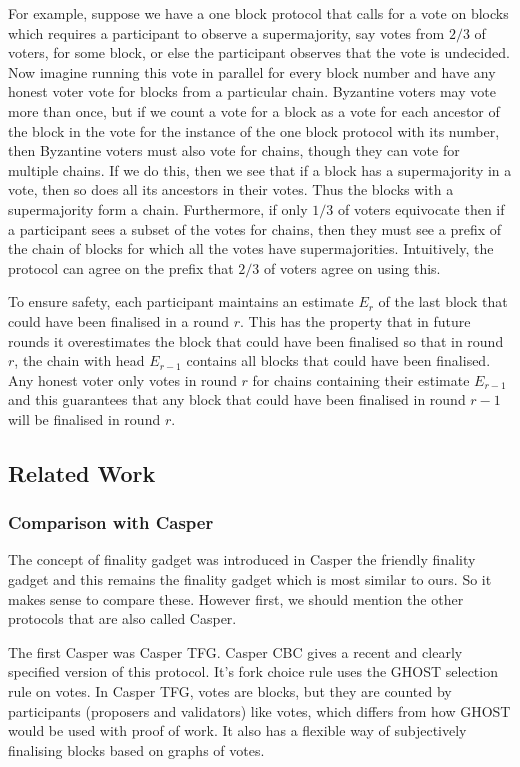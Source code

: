 \documentclass{article}
\begin{document}
For example, suppose we have a one block protocol that calls for a vote on blocks which requires a participant to observe a supermajority, say votes from  $2/3$ of voters, for some block, or else the participant observes that the vote is undecided. Now imagine running this vote in parallel for every block number and have any honest voter vote for blocks from a particular chain.
Byzantine voters may vote more than once, but if we count a vote for a block as a vote for each ancestor of the block in the vote for the instance of the one block protocol with its number, then Byzantine voters must also vote for chains, though they can vote for multiple chains.
If we do this, then we see that if a block has a supermajority in a vote, then so does all its ancestors in their votes. Thus the blocks with a supermajority form a chain.
Furthermore, if only $1/3$ of voters equivocate then if a participant sees a subset of the votes for chains, then they must see a prefix of the chain of blocks for which all the votes have supermajorities. Intuitively, the protocol can agree on the prefix that $2/3$ of voters agree on using this.

To ensure safety, each participant maintains an estimate $E_r$ of the last block that could have been finalised in a round $r$. This has the property that in future rounds it overestimates the block that could have been finalised so that in round $r$, the chain with head $E_{r-1}$ contains all blocks that could have been finalised.
Any honest voter only votes in round $r$ for chains containing their estimate $E_{r-1}$ and this guarantees that any block that could have been finalised in round $r-1$ will be finalised in round $r$.

\subsection{Related Work}

\subsubsection{Comparison with Casper}

The concept of finality gadget was introduced in Casper the friendly finality gadget and this remains the finality gadget which is most similar to ours. So it makes sense to compare these. However first, we should mention the other protocols that are also called Casper.

The first Casper was Casper TFG. Casper CBC\cite{CasperCBC} gives a recent and clearly specified version of this protocol. It's fork choice rule uses the GHOST selection rule on votes.
In Casper TFG, votes are blocks, but they are counted by participants (proposers and validators) like votes, which differs from how GHOST would be used with proof of work. It also has a flexible way of subjectively finalising blocks based on graphs of votes. 
\end{document}

